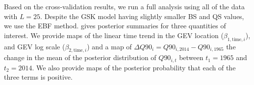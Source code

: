 \documentclass[11pt]{article}
\begin{document}




Based on the cross-validation results, we run a full analysis using all of the data with $L = 25$.
Despite the GSK model having slightly smaller BS and QS values, we use the EBF method.
 gives posterior summaries for three quantities of interest.
We provide maps of the linear time trend in the GEV location ($\beta_{1, \text{time}, i}$), and GEV log scale  ($\beta_{2, \text{time}, i}$)  and a map of \mbox{$\Delta Q90_i = Q90_{i, 2014} - Q90_{i, 1965}$} the change in the mean of the posterior distribution of $Q90_{i, t}$ between $t_1 = 1965$ and $t_2 = 2014$.
We also provide maps of the posterior probability that each of the three terms is positive.
\end{document}
